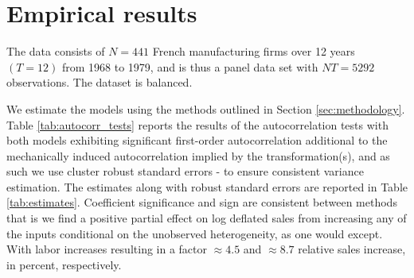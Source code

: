 \section{Empirical results}

The data consists of $N = 441$ French manufacturing firms over 12 years $(T=12)$ from 1968 to 1979, and is thus a panel data set with $NT = 5292$ observations. The dataset is balanced.  

We estimate the models using the methods outlined in Section \ref{sec:methodology}. Table \ref{tab:autocorr_tests} reports the results of the autocorrelation tests with both models exhibiting significant first-order autocorrelation additional to the mechanically induced autocorrelation implied by the transformation(s), and as such we use cluster robust standard errors  - to ensure consistent variance estimation. The estimates along with robust standard errors are reported in Table \ref{tab:estimates}. Coefficient significance and sign are consistent between methods that is we find a positive partial effect on log deflated sales from increasing any of the inputs conditional on the unobserved heterogeneity, as one would except. With labor increases resulting in a factor $\approx 4.5$ and $\approx 8.7$ relative sales increase, in percent, respectively. 





